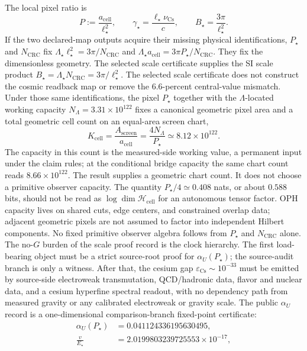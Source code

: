 \documentclass[11pt]{article}
\begin{document}
The local
pixel ratio is
\[
P:=\frac{a_{\mathrm{cell}}}{\ell_\star^2},
\qquad
\gamma_\star=\frac{\ell_\star\nu_{\mathrm{Cs}}}{c},
\qquad
B_\star=\frac{3\pi}{\ell_\star^2}.
\]
If the two declared-map outputs acquire their missing physical identifications,
\(P_\star\) and \(N_{\mathrm{CRC}}\) fix
\(\Lambda_\star\ell_\star^2=3\pi/N_{\mathrm{CRC}}\) and
\(\Lambda_\star a_{\mathrm{cell}}=3\pi P_\star/N_{\mathrm{CRC}}\). They fix the dimensionless
geometry. The selected scale certificate supplies the SI scale product
\(B_\star=\Lambda_\star N_{\mathrm{CRC}}=3\pi/\ell_\star^2\).
The selected scale certificate does not construct the cosmic readback map or remove the
\(6.6\)-percent central-value mismatch.
Under those same identifications, the pixel \(P_\star\) together with the \(\Lambda\)-located
working capacity \(N_\Lambda=3.31\times10^{122}\) fixes a canonical geometric pixel area and a
total geometric cell count on an equal-area screen chart,
\[
K_{\mathrm{cell}}
=\frac{A_{\mathrm{screen}}}{a_{\mathrm{cell}}}
=\frac{4N_\Lambda}{P_\star}
\simeq 8.12\times10^{122}.
\]
The capacity in this count is the measured-side working value, a permanent input under the claim
rules; at the conditional bridge capacity the same chart count reads \(8.66\times10^{122}\).
The result supplies a geometric chart count. It does not choose a primitive observer capacity. The
quantity \(P_\star/4\simeq0.408\) nats, or about \(0.588\) bits, should not be read as
\(\log\dim\mathcal H_{\mathrm{cell}}\) for an autonomous tensor factor. OPH capacity lives on
shared cuts, edge centers, and constrained overlap data; adjacent geometric pixels are not assumed
to factor into independent Hilbert components. No fixed primitive observer algebra follows from
\(P_\star\) and \(N_{\mathrm{CRC}}\) alone.
The no-\(G\) burden of the scale proof record is the clock hierarchy. The first load-bearing object
must be a strict source-root proof for \(\alpha_U(P_\star)\); the source-audit
branch is only a witness. After that, the cesium gap
\(\varepsilon_{\mathrm{Cs}}\sim10^{-33}\) must be emitted by source-side electroweak
transmutation, QCD/hadronic data, flavor and nuclear data, and a cesium hyperfine spectral
readout, with no dependency path from measured gravity or any calibrated electroweak or
gravity scale.
The public \(\alpha_U\) record is a one-dimensional comparison-branch fixed-point certificate:
\[
\begin{aligned}
\alpha_U(P_\star)&=0.041124336195630495,\\
\frac{v}{E_\star}&=2.0199803239725553\times10^{-17},
\end{aligned}
\]
\end{document}
